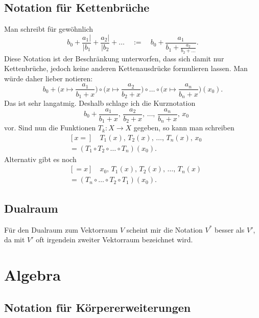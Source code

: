 \documentclass[a4paper,11pt,fleqn]{article}
\begin{document}
\subsection{Notation für Kettenbrüche}
Man schreibt für gewöhnlich
\begin{equation}
b_0 + \frac{a_1|}{|b_1} + \frac{a_2|}{|b_2} + \ldots
\quad:=\quad b_0+\frac{a_1}{b_1+\frac{a_2}{b_2+\ldots}}.
\end{equation}
Diese Notation ist der Beschränkung unterworfen, dass sich damit
nur Kettenbrüche, jedoch keine anderen Kettenausdrücke formulieren
lassen. Man würde daher lieber notieren:
\begin{equation}
b_0+\Big(x\mapsto\frac{a_1}{b_1+x}\Big)
\circ\Big(x\mapsto\frac{a_2}{b_2+x}\Big)
\circ\ldots\circ\Big(x\mapsto\frac{a_n}{b_n+x}\Big)(x_0).
\end{equation}
Das ist sehr langatmig. Deshalb schlage ich die Kurznotation
\begin{equation}
[x{=}]\quad b_0+\frac{a_1}{b_1+x},\,\frac{a_2}{b_2+x},\,\ldots,\,
\frac{a_n}{b_n+x},\,x_0
\end{equation}
vor. Sind nun die Funktionen $T_k\colon X\to X$ gegeben, so
kann man schreiben
\begin{equation}
\begin{split}
& [x{=}]\quad T_1(x),\,T_2(x),\,\ldots,\,T_n(x),\,x_0\\
&= (T_1\circ T_2\circ\ldots\circ T_n)(x_0).
\end{split}
\end{equation}
Alternativ gibt es noch
\begin{equation}
\begin{split}
& [{=}x]\quad x_0,\, T_1(x),\, T_2(x),\,\ldots,\, T_n(x)\\
&= (T_n\circ\ldots\circ T_2\circ T_1)(x_0).
\end{split}
\end{equation}

\subsection{Dualraum}
Für den Dualraum zum Vektorraum $V$ scheint mir die Notation $V^\ast$
besser als $V'$, da mit $V'$ oft irgendein zweiter Vektorraum
bezeichnet wird.

\section{Algebra}
\subsection{Notation für Körpererweiterungen}
\end{document}
